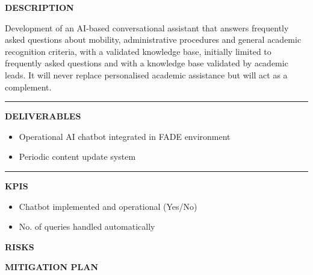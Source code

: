 \documentclass[11pt,a4paper]{scrreprt}
\newcommand{\fieldlabel}[1]{%
  {\footnotesize\sffamily\bfseries\color{mutedcolor}\MakeUppercase{#1}}\par\nopagebreak[4]
}
\newcommand{\fieldsep}{\vspace{3pt}\noindent\textcolor{bordercolor}{\rule{\linewidth}{0.4pt}}\vspace{3pt}\par}
\begin{document}
\begin{tcolorbox}[pabox={fgcolor}{A.P.1.2 \enspace\textbullet\enspace Development of an AI Chatbot for Students and Proposal of Recognition Rules}]

\fieldlabel{Description}
{\small Development of an AI-based conversational assistant that answers frequently asked questions about mobility, administrative procedures and general academic recognition criteria, with a validated knowledge base, initially limited to frequently asked questions and with a knowledge base validated by academic leads. It will never replace personalised academic assistance but will act as a complement. }\par
\fieldsep
\fieldlabel{Deliverables}
{\small \begin{itemize}[noitemsep,topsep=2pt]
\item Operational AI chatbot integrated in FADE environment
\item Periodic content update system
\end{itemize}}\par
\fieldsep
\fieldlabel{KPIs}
{\small \begin{itemize}[noitemsep,topsep=2pt]
\item Chatbot implemented and operational (Yes/No)
\item No. of queries handled automatically
\end{itemize}}\par
\end{tcolorbox}
\begin{tcolorbox}[riskbox]
{\footnotesize\sffamily\bfseries\color{red!50!black} RISKS}\par{}
\end{tcolorbox}
\begin{tcolorbox}[mitbox]
{\footnotesize\sffamily\bfseries\color{green!40!black} MITIGATION PLAN}\par{}
\end{tcolorbox}
\vspace{8pt}
\end{document}
